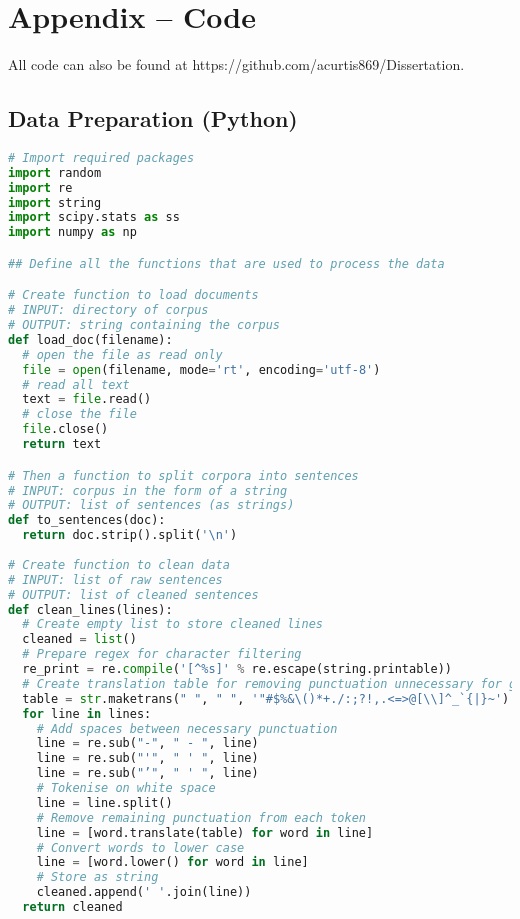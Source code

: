 \documentclass[11pt]{article}
\begin{document}
\newpage

\appendix
\section{Appendix -- Code}

All code can also be found at https://github.com/acurtis869/Dissertation.

\subsection{Data Preparation (Python)}

\begin{lstlisting}[language=Python]
# Import required packages
import random
import re
import string
import scipy.stats as ss
import numpy as np

## Define all the functions that are used to process the data

# Create function to load documents
# INPUT: directory of corpus
# OUTPUT: string containing the corpus
def load_doc(filename):
  # open the file as read only
  file = open(filename, mode='rt', encoding='utf-8')
  # read all text
  text = file.read()
  # close the file
  file.close()
  return text

# Then a function to split corpora into sentences
# INPUT: corpus in the form of a string
# OUTPUT: list of sentences (as strings)
def to_sentences(doc):
  return doc.strip().split('\n')
  
# Create function to clean data
# INPUT: list of raw sentences
# OUTPUT: list of cleaned sentences
def clean_lines(lines):
  # Create empty list to store cleaned lines
  cleaned = list()
  # Prepare regex for character filtering
  re_print = re.compile('[^%s]' % re.escape(string.printable))
  # Create translation table for removing punctuation unnecessary for grammar
  table = str.maketrans(" ", " ", '"#$%&\()*+./:;?!,.<=>@[\\]^_`{|}~')
  for line in lines:
    # Add spaces between necessary punctuation
    line = re.sub("-", " - ", line)
    line = re.sub("'", " ' ", line)
    line = re.sub("’", " ' ", line)
    # Tokenise on white space
    line = line.split()
    # Remove remaining punctuation from each token
    line = [word.translate(table) for word in line]
    # Convert words to lower case
    line = [word.lower() for word in line]
    # Store as string
    cleaned.append(' '.join(line))
  return cleaned
  

\end{lstlisting}
\end{document}
